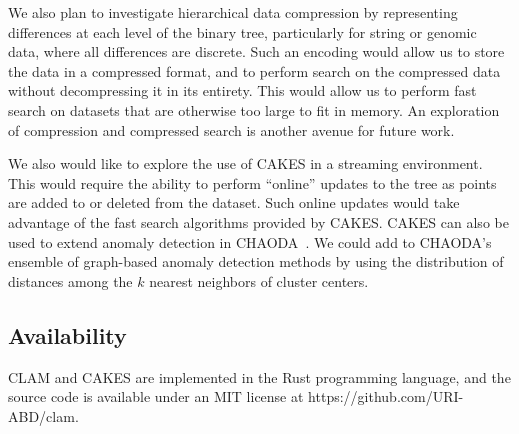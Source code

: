 We also plan to investigate hierarchical data compression by representing differences at each level of the binary tree, particularly for string or genomic data, where all differences are discrete.
Such an encoding would allow us to store the data in a compressed format, and to perform search on the compressed data without decompressing it in its entirety.
This would allow us to perform fast search on datasets that are otherwise too large to fit in memory.
An exploration of compression and compressed search is another avenue for future work.

We also would like to explore the use of CAKES in a streaming environment.
This would require the ability to perform ``online'' updates to the tree as points are added to or deleted from the dataset.
Such online updates would take advantage of the fast search algorithms provided by CAKES.  %
CAKES can also be used to extend anomaly detection in CHAODA~\cite{ishaq2021clustered}.
We could add to CHAODA's ensemble of graph-based anomaly detection methods by using the distribution of distances among the $k$ nearest neighbors of cluster centers.

\subsection{Availability}

CLAM and CAKES are implemented in the Rust programming language, and the source code is available under an MIT license at https://github.com/URI-ABD/clam.
